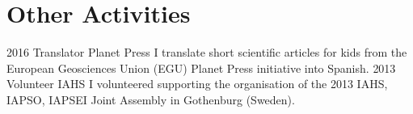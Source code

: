 \section{Other Activities}
    \position
        {2016 \textemdash{}}
        {Translator}
        {Planet Press}
        {I translate short scientific articles for kids from the European Geosciences Union (EGU) Planet Press initiative into Spanish.}
    \position
        {2013}
        {Volunteer}
        {IAHS}
        {I volunteered supporting the organisation of the 2013 IAHS, IAPSO, IAPSEI Joint Assembly in Gothenburg (Sweden).}
